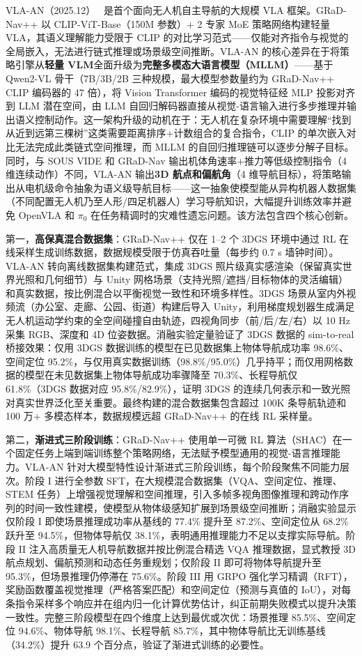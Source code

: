 VLA-AN（2025.12）~\cite{2512_15258} 是首个面向无人机自主导航的大规模 VLA 框架。GRaD-Nav++ 以 CLIP-ViT-Base（150M 参数）+ 2 专家 MoE 策略网络构建轻量 VLA，其语义理解能力受限于 CLIP 的对比学习范式——仅能对齐指令与视觉的全局嵌入，无法进行链式推理或场景级空间推断。VLA-AN 的核心差异在于将策略引擎从\textbf{轻量 VLM}全面升级为\textbf{完整多模态大语言模型（MLLM）}——基于 Qwen2-VL 骨干（7B/3B/2B 三种规模，最大模型参数量约为 GRaD-Nav++ CLIP 编码器的 47 倍），将 Vision Transformer 编码的视觉特征经 MLP 投影对齐到 LLM 潜在空间，由 LLM 自回归解码器直接从视觉-语言输入进行多步推理并输出语义控制动作。这一架构升级的动机在于：无人机在复杂环境中需要理解``找到从近到远第三棵树''这类需要距离排序+计数组合的复合指令，CLIP 的单次嵌入对比无法完成此类链式空间推理，而 MLLM 的自回归推理链可以逐步分解子目标。同时，与 SOUS VIDE 和 GRaD-Nav 输出机体角速率+推力等低级控制指令（4 维连续动作）不同，VLA-AN 输出\textbf{3D 航点和偏航角}（4 维导航目标），将策略输出从电机级命令抽象为语义级导航目标——这一抽象使模型能从异构机器人数据集（不同配置无人机乃至人形/四足机器人）学习导航知识，大幅提升训练效率并避免 OpenVLA 和 $\pi_0$ 在任务精调时的灾难性遗忘问题。该方法包含四个核心创新。

第一，\textbf{高保真混合数据集}：GRaD-Nav++ 仅在 1--2 个 3DGS 环境中通过 RL 在线采样生成训练数据，数据规模受限于仿真吞吐量（每步约 0.7 s 墙钟时间）。VLA-AN 转向离线数据集构建范式，集成 3DGS 照片级真实感渲染（保留真实世界光照和几何细节）与 Unity 网格场景（支持光照/遮挡/目标物体的灵活编辑）和真实数据，按比例混合以平衡视觉一致性和环境多样性。3DGS 场景从室内外视频流（办公室、走廊、公园、街道）构建后导入 Unity，利用梯度规划器生成满足无人机运动学约束的全空间碰撞自由轨迹，四视角同步（前/后/左/右）以 10 Hz 采集 RGB、深度和 4D 位姿数据。消融实验定量验证了 3DGS 数据的 sim-to-real 桥接效果：仅用 3DGS 数据训练的模型在已见数据集上物体导航成功率 98.6\%、空间定位 95.2\%，与仅用真实数据训练（98.8\%/95.0\%）几乎持平；而仅用网格数据的模型在未见数据集上物体导航成功率骤降至 70.3\%、长程导航仅 61.8\%（3DGS 数据对应 95.8\%/82.9\%），证明 3DGS 的连续几何表示和一致光照对真实世界泛化至关重要。最终构建的混合数据集包含超过 100K 条导航轨迹和 100 万+ 多模态样本，数据规模远超 GRaD-Nav++ 的在线 RL 采样量。

第二，\textbf{渐进式三阶段训练}：GRaD-Nav++ 使用单一可微 RL 算法（SHAC）在一个固定任务上端到端训练整个策略网络，无法赋予模型通用的视觉-语言推理能力。VLA-AN 针对大模型特性设计渐进式三阶段训练，每个阶段聚焦不同能力层次。阶段 I 进行全参数 SFT，在大规模混合数据集（VQA、空间定位、推理、STEM 任务）上增强视觉理解和空间推理，引入多帧多视角图像推理和跨动作序列的时间一致性建模，使模型从物体级感知扩展到场景级空间推断；消融实验显示仅阶段 I 即使场景推理成功率从基线的 77.4\% 提升至 87.2\%、空间定位从 68.2\% 跃升至 94.5\%，但物体导航仅 38.1\%，表明通用推理能力不足以支撑实际导航。阶段 II 注入高质量无人机导航数据并按比例混合精选 VQA 推理数据，显式教授 3D 航点规划、偏航预测和动态任务重规划；仅阶段 II 即可将物体导航提升至 95.3\%，但场景推理仍停滞在 75.6\%。阶段 III 用 GRPO 强化学习精调（RFT），奖励函数覆盖视觉推理（严格答案匹配）和空间定位（预测与真值的 IoU），对每条指令采样多个响应并在组内归一化计算优势估计，纠正前期失败模式以提升决策一致性。完整三阶段模型在四个维度上达到最优或次优：场景推理 85.5\%、空间定位 94.6\%、物体导航 98.1\%、长程导航 85.7\%，其中物体导航比无训练基线（34.2\%）提升 63.9 个百分点，验证了渐进式训练的必要性。

